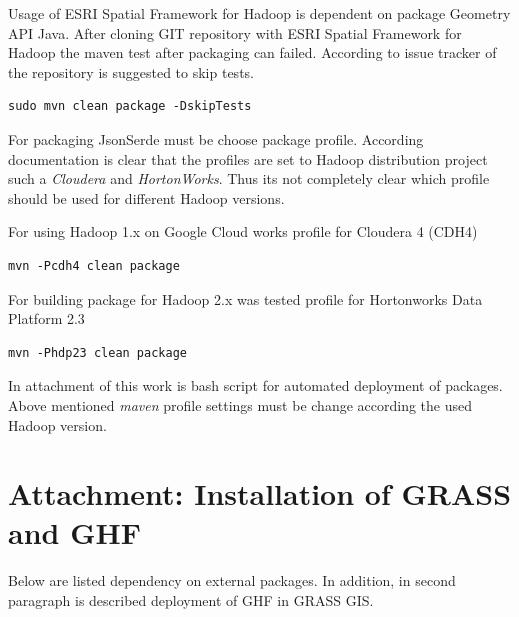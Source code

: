 \documentclass[a4paper,12pt,oneside]{report}
\begin{document}
	Usage of ESRI Spatial Framework for Hadoop is dependent on package Geometry API
	Java. After cloning GIT repository with ESRI Spatial Framework for Hadoop the
	maven test after packaging can failed. According to issue tracker of the
	repository is suggested to skip tests.
	\begin{footnotesize}
		\begin{lstlisting}[style=python]
sudo mvn clean package -DskipTests 
		\end{lstlisting}
	\end{footnotesize}
	
	For packaging JsonSerde 
	must be choose package profile. According documentation is clear that the
	profiles are set to Hadoop distribution project such a \textit{Cloudera} and
	\textit{HortonWorks}. Thus its not completely clear which profile should be
used
	for different Hadoop versions. 
	
	For using Hadoop 1.x on Google Cloud works profile for Cloudera 4 (CDH4)
	\begin{footnotesize}
		\begin{lstlisting}[style=python]
mvn -Pcdh4 clean package
		\end{lstlisting}
	\end{footnotesize}
	For building package for Hadoop 2.x was tested profile for Hortonworks Data
	Platform 2.3
	\begin{footnotesize}
		\begin{lstlisting}[style=python]
mvn -Phdp23 clean package
		\end{lstlisting}
	\end{footnotesize}
	
	In attachment of this work is bash script for automated deployment of packages.
	Above mentioned \textit{maven} profile settings must be change according the
	used Hadoop version.
	
	
\newpage	
	
\section{Attachment: Installation of GRASS and GHF}\label{grass_install}
		
		Below are listed  dependency on external packages. In addition, in second
		paragraph is described deployment of GHF in GRASS GIS. 
\end{document}
